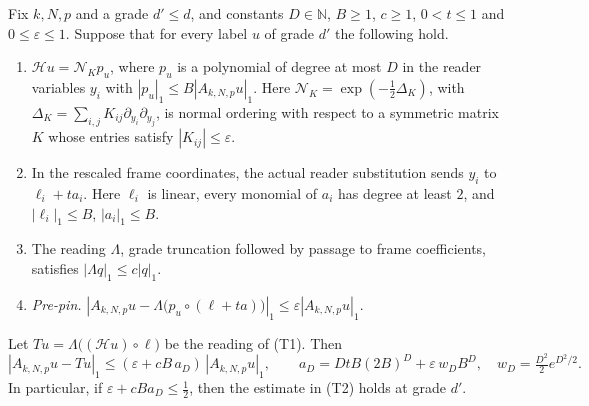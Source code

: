 \begin{lemma}
\label{lem:rank-trace-pin-reduction}
Fix $k,N,p$ and a grade $d'\le d$, and constants $D\in\mathbb N$,
$B\ge1$, $c\ge1$, $0<t\le1$ and $0\le\varepsilon\le1$. Suppose that for
every label $u$ of grade $d'$ the following hold.
\begin{enumerate}
\item $\mathcal Hu=\mathcal N_Kp_u$, where $p_u$ is a polynomial of degree
 at most $D$ in the reader variables $y_i$ with $|p_u|_1\le B|A_{k,N,p}u|_1$.
 Here $\mathcal N_K=\exp(-\frac12\Delta_K)$, with
 $\Delta_K=\sum_{i,j}K_{ij}\partial_{y_i}\partial_{y_j}$, is normal
 ordering with respect to a symmetric matrix $K$ whose entries satisfy
 $|K_{ij}|\le\varepsilon$.
\item In the rescaled frame coordinates, the actual reader substitution
 sends $y_i$ to $\ell_i+ta_i$. Here $\ell_i$ is linear, every monomial of
 $a_i$ has degree at least $2$, and $|\ell_i|_1\le B$, $|a_i|_1\le B$.
\item The reading $\Lambda$, grade truncation followed by passage to frame
 coefficients, satisfies $|\Lambda q|_1\le c|q|_1$.
\item \emph{Pre-pin.}
 $|A_{k,N,p}u-\Lambda\bigl(p_u\circ(\ell+ta)\bigr)|_1\le\varepsilon|A_{k,N,p}u|_1$.
\end{enumerate}
Let $Tu=\Lambda\bigl((\mathcal Hu)\circ\ell\bigr)$ be the reading of
(T1). Then
\[
 |A_{k,N,p}u-Tu|_1\le(\varepsilon+cB\,a_D)\,|A_{k,N,p}u|_1,\qquad
 a_D=DtB(2B)^D+\varepsilon\,w_DB^D,\quad w_D=\tfrac{D^2}2e^{D^2/2}.
\]
In particular, if $\varepsilon+cBa_D\le\frac12$, then the estimate in (T2)
holds at grade $d'$.
\end{lemma}
